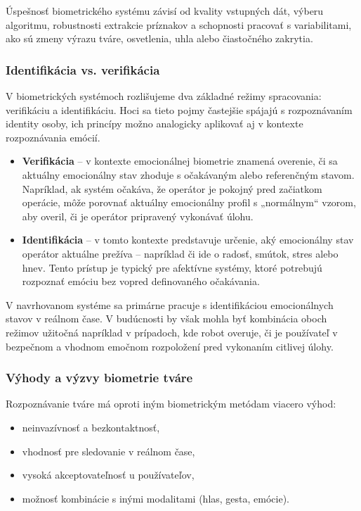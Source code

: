 Úspešnosť biometrického systému závisí od kvality vstupných dát, výberu algoritmu, robustnosti extrakcie príznakov a schopnosti pracovať s variabilitami, ako sú zmeny výrazu tváre, osvetlenia, uhla alebo čiastočného zakrytia.
\subsubsection{Identifikácia vs. verifikácia}

V biometrických systémoch rozlišujeme dva základné režimy spracovania: verifikáciu a identifikáciu. Hoci sa tieto pojmy častejšie spájajú s rozpoznávaním identity osoby, ich princípy možno analogicky aplikovať aj v kontexte rozpoznávania emócií.

\begin{itemize}
    \item \textbf{Verifikácia} -- v kontexte emocionálnej biometrie znamená overenie, či sa aktuálny emocionálny stav zhoduje s očakávaným alebo referenčným stavom. Napríklad, ak systém očakáva, že operátor je pokojný pred začiatkom operácie, môže porovnať aktuálny emocionálny profil s „normálnym“ vzorom, aby overil, či je operátor pripravený vykonávať úlohu.
    \item \textbf{Identifikácia} -- v tomto kontexte predstavuje určenie, aký emocionálny stav operátor aktuálne prežíva – napríklad či ide o radosť, smútok, stres alebo hnev. Tento prístup je typický pre afektívne systémy, ktoré potrebujú rozpoznať emóciu bez vopred definovaného očakávania.
\end{itemize}

V navrhovanom systéme sa primárne pracuje s identifikáciou emocionálnych stavov v reálnom čase. V budúcnosti by však mohla byť kombinácia oboch režimov užitočná napríklad v prípadoch, kde robot overuje, či je používateľ v bezpečnom a vhodnom emočnom rozpoložení pred vykonaním citlivej úlohy.
\subsubsection{Výhody a výzvy biometrie tváre}

Rozpoznávanie tváre má oproti iným biometrickým metódam viacero výhod:

\begin{itemize}
    \item neinvazívnosť a bezkontaktnosť,
    \item vhodnosť pre sledovanie v reálnom čase,
    \item vysoká akceptovateľnosť u používateľov,
    \item možnosť kombinácie s inými modalitami (hlas, gesta, emócie).
\end{itemize}

